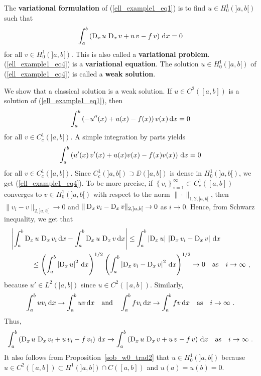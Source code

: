 \begin{egg}
The {\bfseries variational formulation} of
(\ref{ell_example1_eq1}) is to find $\displaystyle u \in H^1_0(]a,b[)$ such that
\begin{equation} \label{ell_example1_eq4}
\int_a^b \left( \operatorname{D}_x u\,\operatorname{D}_x v + u\, v -f\, v \right) \,\mathrm{d}{x} = 0
\end{equation}
for all $\displaystyle v \in H^{1}_0(]a,b[)$.
This is also called a {\bfseries variational problem}.
(\ref{ell_example1_eq4}) is a {\bfseries variational equation}.  The
solution $\displaystyle u \in H^1_0(]a,b[)$ of
(\ref{ell_example1_eq4}) is called a {\bfseries weak solution}.

We show that a classical solution is a weak solution.  If
$\displaystyle u \in C^2([a,b])$ is a solution of (\ref{ell_example1_eq1}), then
\[
\int_a^b \left( - u''(x) + u(x) - f(x) \right)v(x)\,\mathrm{d}{x} = 0
\]
for all $\displaystyle v \in C^1_c(]a,b[)$.
A simple integration by parts yields
\[
\int_a^b \left( u'(x)\, v'(x)+ u(x) v(x) -
f(x)v(x)\right) \,\mathrm{d}{x} = 0
\]
for all $\displaystyle v \in C^1_c(]a,b[)$.
Since $\displaystyle C^1_c(]a,b[)\supset \DD(]a,b[)$ is dense in
$\displaystyle H^1_0(]a,b[)$, we get (\ref{ell_example1_eq4}).  To be
more precise, if
$\displaystyle \left\{v_i\right\}_{i=1}^\infty \subset C^1_c([a,b])$
converges to $\displaystyle v \in H^1_0(]a,b[)$ with respect to the norm
$\|\cdot\|_{1,2,]a,b[}$, then
$\displaystyle \|v_i - v\|_{2,]a,b[} \to 0$ and
$\displaystyle \|\operatorname{D}_x v_i - \operatorname{D}_x v\|_{2,]a,b[} \to 0$ as $i \to 0$.
Hence, from Schwarz inequality, we get that
\begin{align*}
&\left|\int_a^b \operatorname{D}_x u \, \operatorname{D}_x v_i \,\mathrm{d}{x} - 
\int_a^b \operatorname{D}_x u\, \operatorname{D}_x v \,\mathrm{d}{x} \right|
\leq \int_a^b \left|\operatorname{D}_x u\right| \,
\left| \operatorname{D}_x v_i -\operatorname{D}_x v\right| \,\mathrm{d}{x} \\
&\qquad \quad \leq \left(\int_a^b \left|\operatorname{D}_x u\right|^2 \,\mathrm{d}{x} \right)^{1/2}
\left( \int_a^b \left| \operatorname{D}_x v_i -\operatorname{D}_x v\right|^2 \,\mathrm{d}{x} \right)^{1/2}
\to 0 \quad \text{as} \quad i \to \infty \ ,
\end{align*}
because $\displaystyle u' \in L^2(]a,b[)$ since $u\in C^2([a,b])$.  Similarly,
\[
\int_a^b u v_i \,\mathrm{d}{x} \to \int_a^b u v \,\mathrm{d}{x} \quad \text{and} \quad
\int_a^b f v_i \,\mathrm{d}{x} \to \int_a^b f v \,\mathrm{d}{x} \quad \text{as} \quad
i \to \infty \ .
\]
Thus,
\[
\int_a^b \left( \operatorname{D}_x u\, \operatorname{D}_x v_i + u\, v_i  - f\, v_i\right) \,\mathrm{d}{x} \to
\int_a^b \left( \operatorname{D}_x u \, \operatorname{D}_x v + u\, v - f\, v \right) \,\mathrm{d}{x}
\quad \text{as} \quad i \to \infty \ .
\]
It also follows from Proposition~\ref{sob_w0_trad2} that
$\displaystyle u \in H^1_0(]a,b[)$ because \\
$\displaystyle u \in C^2([a,b]) \subset H^1(]a,b[) \cap C([a,b])$ and
$u(a)=u(b)=0$.


\end{egg}
